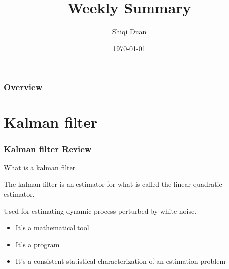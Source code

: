 \documentclass{beamer}
\title[Short title]{Weekly Summary} %
\author{Shiqi Duan} %
\institute[USTC] %
{
University of Science and Technology of China \\ %
\medskip
\textit{sqduan@mail.ustc.edu.cn} %
}
\date{\today} %
\begin{document}
\begin{frame}
\titlepage %
\end{frame}

\begin{frame}
\frametitle{Overview} %
\tableofcontents %
\end{frame}


\section{Kalman filter}






\begin{frame}
\frametitle{Kalman filter Review}
\begin{block}{What is a kalman filter}
	
The kalman filter is an estimator for what is called the linear quadratic estimator.
 
Used for estimating dynamic process perturbed by white noise.

\begin{itemize}
	\item It's a mathematical tool 
	\item It's a program 
	\item It's a consistent statistical characterization of an estimation problem
	
\end{itemize}

\end{block}

\end{frame}
\end{document}
